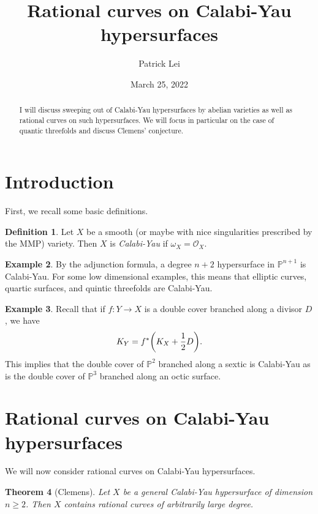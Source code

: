 \documentclass{amsart}
\title{Rational curves on Calabi-Yau hypersurfaces}
\author{Patrick Lei}
\date{March 25, 2022}
\newtheorem{thm}{Theorem}[section]
\theoremstyle{definition}
\newtheorem{defn}[thm]{Definition}
\newtheorem{exm}[thm]{Example}
\theoremstyle{remark}
\theoremstyle{plain}
\theoremstyle{definition}
\theoremstyle{remark}
\renewcommand{\P}{\mathbb{P}}
\newcommand{\mc}[1]{\mathcal{#1}}
\newcommand{\1}{\mathbf{1}}
\newcommand{\2}{\mathbf{2}}
\newcommand{\3}{\mathbf{3}}
\begin{document}
    
\maketitle

\begin{abstract}
    I will discuss sweeping out of Calabi-Yau hypersurfaces by abelian varieties as well as rational curves on such hypersurfaces. We will focus in particular on the case of quantic threefolds and discuss Clemens' conjecture.
\end{abstract}

\section{Introduction}

First, we recall some basic definitions.

\begin{defn}
    Let $X$ be a smooth (or maybe with nice singularities prescribed by the MMP) variety. Then $X$ is \textit{Calabi-Yau} if $\omega_X = \mc{O}_X$.
\end{defn}

\begin{exm}
    By the adjunction formula, a degree $n+2$ hypersurface in $\P^{n+1}$ is Calabi-Yau. For some low dimensional examples, this means that elliptic curves, quartic surfaces, and quintic threefolds are Calabi-Yau.
\end{exm}

\begin{exm}
    Recall that if $f \colon Y \to X$ is a double cover branched along a divisor $D$, we have
    \[ K_Y = f^* \qty(K_X + \frac{1}{2} D). \]
    This implies that the double cover of $\P^2$ branched along a sextic is Calabi-Yau as is the double cover of $\P^3$ branched along an octic surface.
\end{exm}

\section{Rational curves on Calabi-Yau hypersurfaces}

We will now consider rational curves on Calabi-Yau hypersurfaces.

\begin{thm}[Clemens]
    Let $X$ be a general Calabi-Yau hypersurface of dimension $n \geq 2$. Then $X$ contains rational curves of arbitrarily large degree.
\end{thm}
\end{document}

